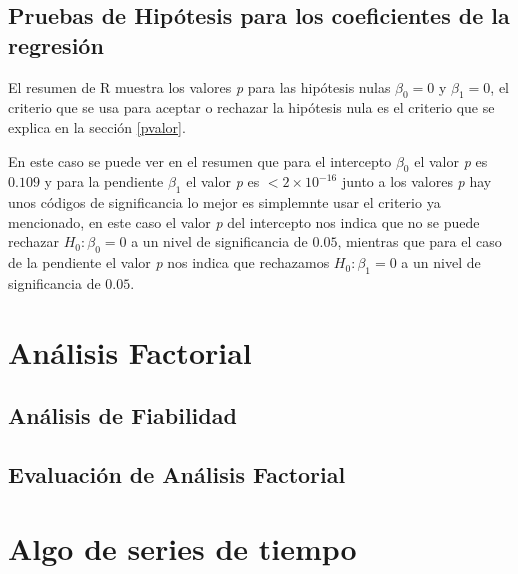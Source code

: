\documentclass[]{book}
\begin{document}
\hypertarget{pruebas-de-hipotesis-para-los-coeficientes-de-la-regresion}{%
\section{Pruebas de Hipótesis para los coeficientes de la regresión}\label{pruebas-de-hipotesis-para-los-coeficientes-de-la-regresion}}

El resumen de R muestra los valores \emph{p} para las hipótesis nulas \(\beta_0=0\) y \(\beta_1=0\), el criterio que se usa para aceptar o rechazar la hipótesis nula es el criterio que se explica en la sección \ref{pvalor}.

En este caso se puede ver en el resumen que para el intercepto \(\beta_0\) el valor \emph{p} es \(0.109\) y para la pendiente \(\beta_1\) el valor \emph{p} es \(<2 \times 10^{-16}\) junto a los valores \emph{p} hay unos códigos de significancia
lo mejor es simplemnte usar el criterio ya mencionado, en este caso el valor \emph{p} del intercepto nos indica que no se puede rechazar \(H_0: \beta_0=0\) a un nivel de significancia de \(0.05\), mientras que para el caso de la pendiente el valor \emph{p} nos indica que rechazamos \(H_0: \beta_1=0\) a un nivel de significancia de \(0.05\).

\hypertarget{analisis-factorial}{%
\chapter{Análisis Factorial}\label{analisis-factorial}}

\hypertarget{analisis-de-fiabilidad}{%
\section{Análisis de Fiabilidad}\label{analisis-de-fiabilidad}}

\hypertarget{evaluacion-de-analisis-factorial}{%
\section{Evaluación de Análisis Factorial}\label{evaluacion-de-analisis-factorial}}

\hypertarget{algo-de-series-de-tiempo}{%
\chapter{Algo de series de tiempo}\label{algo-de-series-de-tiempo}}


\end{document}
